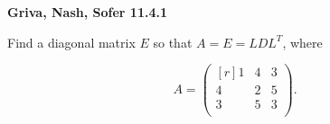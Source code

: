\textbf{Griva, Nash, Sofer 11.4.1}

Find a diagonal matrix $E$ so that $A = E = L D L^T$, where

$$
A = \begin{pmatrix*}[r]
    1 & 4 & 3 \\
    4 & 2 & 5 \\
    3 & 5 & 3 \\
\end{pmatrix*}.
$$

\begin{solution}
    \ \\
    \vfill
\end{solution}
